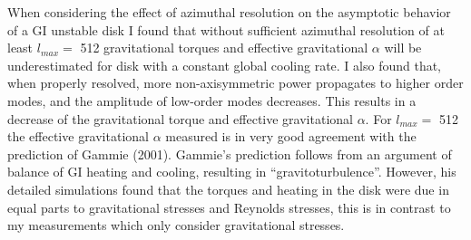 \documentclass[manuscript]{aastex} %
\begin{document}
When considering the effect of azimuthal resolution on the asymptotic behavior
of a GI unstable disk I found that without sufficient azimuthal resolution of at least
$l_{max} =$ 512 gravitational torques and effective gravitational $\alpha$
will be underestimated
for disk with a constant global cooling rate. I also found that, when properly resolved,
more non-axisymmetric power propagates to higher order modes, and the amplitude
of low-order modes decreases. This results in a decrease of the gravitational torque
and effective gravitational $\alpha$. For $l_{max} =$ 512 the effective gravitational 
$\alpha$ measured
is in very good agreement with the prediction of Gammie (2001). Gammie's 
prediction follows from an argument of balance of GI heating and cooling, resulting in
``gravitoturbulence''. However, his detailed simulations found that the torques and
heating in the disk were due in equal parts to gravitational stresses and Reynolds
stresses, this is in contrast to my measurements which only consider gravitational
stresses.


\acknowledgements





\newpage



\end{document}
